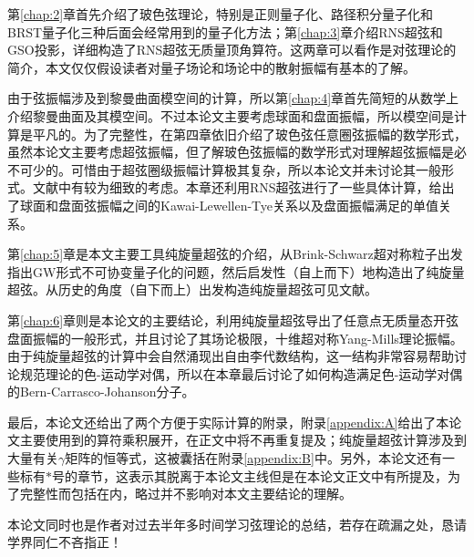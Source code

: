 第\ref{chap:2}章首先介绍了玻色弦理论，特别是正则量子化、路径积分量子化和BRST量子化三种后面会经常用到的量子化方法；第\ref{chap:3}章介绍RNS超弦和GSO投影，详细构造了RNS超弦无质量顶角算符。这两章可以看作是对弦理论的简介，本文仅仅假设读者对量子场论和场论中的散射振幅有基本的了解。

由于弦振幅涉及到黎曼曲面模空间的计算，所以第\ref{chap:4}章首先简短的从数学上介绍黎曼曲面及其模空间。不过本论文主要考虑球面和盘面振幅，所以模空间是计算是平凡的。为了完整性，在第四章依旧介绍了玻色弦任意圈弦振幅的数学形式，虽然本论文主要考虑超弦振幅，但了解玻色弦振幅的数学形式对理解超弦振幅是必不可少的。可惜由于超弦圈级振幅计算极其复杂，所以本论文并未讨论其一般形式。文献\cite{Witten:2012bh,DHoker:2002hof}中有较为细致的考虑。本章还利用RNS超弦进行了一些具体计算，给出了球面和盘面弦振幅之间的Kawai-Lewellen-Tye关系以及盘面振幅满足的单值关系。

第\ref{chap:5}章是本文主要工具纯旋量超弦的介绍，从Brink-Schwarz超对称粒子出发指出GW形式不可协变量子化的问题，然后启发性（自上而下）地构造出了纯旋量超弦。从历史的角度（自下而上）出发构造纯旋量超弦可见文献\cite{Berkovits:2002zk,Mafra:2008gkx}。

第\ref{chap:6}章则是本论文的主要结论，利用纯旋量超弦导出了任意点无质量态开弦盘面振幅的一般形式，并且讨论了其场论极限，十维超对称Yang-Mills理论振幅。由于纯旋量超弦的计算中会自然涌现出自由李代数结构，这一结构非常容易帮助讨论规范理论的色-运动学对偶，所以在本章最后讨论了如何构造满足色-运动学对偶的Bern-Carrasco-Johanson分子\cite{Mafra:2011kj}。

最后，本论文还给出了两个方便于实际计算的附录，附录\ref{appendix:A}给出了本论文主要使用到的算符乘积展开，在正文中将不再重复提及；纯旋量超弦计算涉及到大量有关$\gamma$矩阵的恒等式，这被囊括在附录\ref{appendix:B}中。另外，本论文还有一些标有$*$号的章节，这表示其脱离于本论文主线但是在本论文正文中有所提及，为了完整性而包括在内，略过并不影响对本文主要结论的理解。

本论文同时也是作者对过去半年多时间学习弦理论的总结，若存在疏漏之处，恳请学界同仁不吝指正！